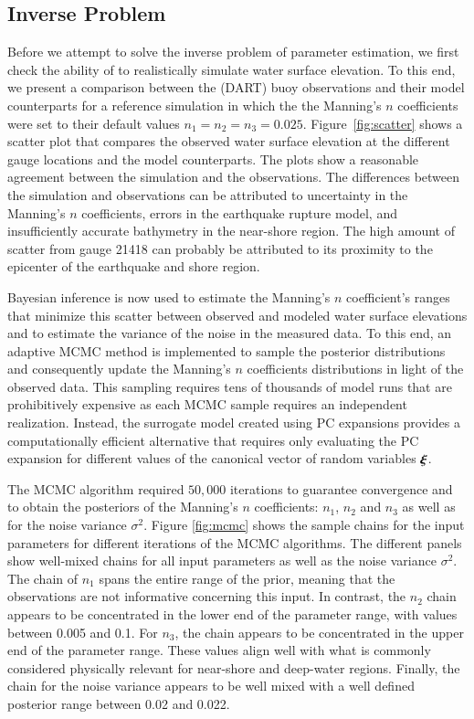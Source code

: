 \subsection{Inverse Problem} 
\label{sec:inverse}

Before we attempt to solve the inverse problem of parameter estimation, 
we first check the ability of \geoclaw to realistically simulate water 
surface elevation. To this end, we present a comparison between the 
(DART) buoy observations and their \geoclaw model counterparts
for a reference simulation in which the the Manning's $n$ coefficients were set to their default values $n_1=n_2=n_3=0.025$. Figure~\ref{fig:scatter} 
shows a scatter plot that compares the observed 
water surface elevation at the different gauge locations and the \geoclaw model counterparts. The plots show a reasonable agreement between the simulation and the observations.  The differences between the simulation and observations can be attributed to uncertainty in the Manning's $n$ coefficients, errors in the earthquake rupture model, and insufficiently accurate bathymetry in the near-shore region.  The high amount of scatter from gauge 21418 can probably be attributed to its proximity to the epicenter of the earthquake and shore region.

Bayesian inference is now used to estimate the Manning's 
$n$ coefficient's ranges that minimize this scatter between 
observed and modeled water surface elevations and to estimate the variance of the noise in the measured data.
To this end, an adaptive MCMC method is implemented to sample 
the posterior distributions \citep{Gareth2009,Haario2001} and consequently 
update the Manning's $n$ coefficients distributions in light of the 
observed data. This sampling requires tens of thousands of 
\geoclaw model runs that are prohibitively expensive as each MCMC 
sample requires an independent \geoclaw realization. Instead,
the surrogate model created using PC expansions provides a computationally
efficient alternative that requires only evaluating the PC expansion
for different values of the canonical vector of random variables $\xxi$.

The MCMC algorithm required $50,000$ iterations to guarantee convergence and to
obtain the posteriors of the Manning's $n$ coefficients:  $n_1$, $n_2$ and $n_3$
as well as for the noise variance $\sigma^2$. Figure \ref{fig:mcmc}  shows the sample
chains for the input parameters for different iterations of the MCMC algorithms.
The different panels show well-mixed chains for all input parameters as well as
the noise variance $\sigma^2$. The chain of  $n_{1}$ spans the entire range of the
prior, meaning that the observations are not informative  concerning this input.
In contrast, the $n_{2}$ chain appears to be concentrated in the  lower end of
the parameter range, with values between 0.005 and 0.1. For $n_{3}$, the chain
appears to be concentrated in the  upper end of the parameter range. These values align well with what is
commonly considered physically relevant for near-shore and deep-water regions.
Finally, the chain for the noise variance  appears to be well mixed with a well defined
posterior range between 0.02 and 0.022.  


